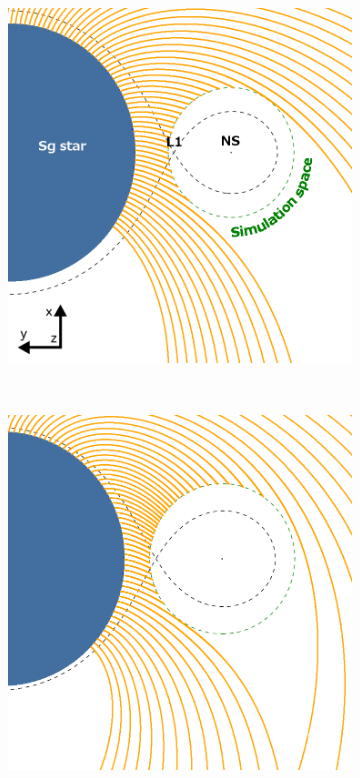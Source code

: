 \documentclass{aa}
\begin{document}
\begin{figure}
\begin{subfigure}{.5\textwidth}
\centering
\includegraphics[width=0.99\columnwidth]{Pictures/LF.png}
  \label{fig:sfig1}
\end{subfigure}
\phantom{p}\\
\begin{subfigure}{.5\textwidth}
\centering
\includegraphics[width=0.99\columnwidth]{Pictures/HS.png}

\end{subfigure}
\end{figure}
\end{document}
